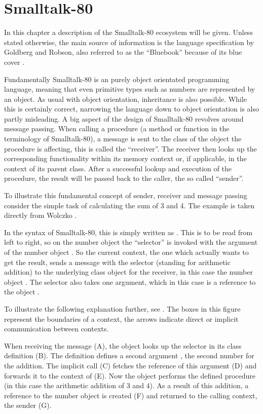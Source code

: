 \chapter{Smalltalk-80}\label{cha:smalltalk}
In this chapter a description of the Smalltalk-80 ecosystem will be given. 
Unless stated otherwise, the main source of information is the language specification by Goldberg and Robson, also referred to as the \enquote{Bluebook} because of its blue cover \cite{bluebook1983}.

Fundamentally Smalltalk-80 is an purely object orientated programming language, meaning that even primitive types such as numbers are represented by an object. 
As usual with object orientation, inheritance is also possible.
While this is certainly correct, narrowing the language down to object orientation is also partly misleading. 
A big aspect of the design of Smalltalk-80 revolves around message passing. 
When calling a procedure (a method or function in the terminology of Smalltalk-80), a message is sent to the class of the object the procedure is affecting, this is called the \enquote{receiver}.
The receiver then looks up the corresponding functionality within its memory context or, if applicable, in the context of its parent class.
After a successful lookup and execution of the procedure, the result will be passed back to the caller, the so called \enquote{sender}. 

To illustrate this fundamental concept of sender, receiver and message passing consider the simple task of calculating the sum of 3 and 4. 
The example is taken directly from Wolczko \cite{Wolczko1984}.

In the syntax of Smalltalk-80, this is simply written as .
This is to be read from left to right, so on the number object  the \enquote{selector} \stcode{+} is invoked with the argument of the number object .
So the current context, the one which actually wants to get the result, sends a message with the selector \stcode{+} (standing for arithmetic addition) to the underlying class object for the receiver, in this case the number object . 
The selector \stcode{+} also takes one argument, which in this case is a reference to the object . 

To illustrate the following explanation further, see . The boxes in this figure represent the boundaries of a context, the arrows indicate direct or implicit communication between contexts.

When receiving the message (A), the object  looks up the selector in its class definition (B). 
The definition defines a second argument , the second number for the addition. The implicit call (C) fetches the reference of this argument (D) and forwards it to the context of  (E).
Now the object  performs the defined procedure (in this case the arithmetic addition of 3 and 4). 
As a result of this addition, a reference to the number object  is created (F) and returned to the calling context, the sender (G). 

